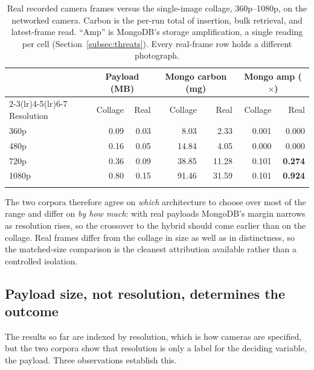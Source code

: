 \documentclass[pdflatex,sn-basic]{sn-jnl}%
\begin{document}
\begin{table}[htbp]
\caption{Real recorded camera frames versus the single-image collage, 360p--1080p, on the networked camera. Carbon is the per-run total of insertion, bulk retrieval, and latest-frame read. ``Amp'' is MongoDB's storage amplification, a single reading per cell (Section~\ref{subsec:threats}). Every real-frame row holds a different photograph.}\label{tab:realframes}
\small
\begin{tabular}{@{}lrrrrrr@{}}
\toprule
 & \multicolumn{2}{c}{Payload (MB)} & \multicolumn{2}{c}{Mongo carbon (mg)} & \multicolumn{2}{c}{Mongo amp ($\times$)} \\
\cmidrule(lr){2-3}\cmidrule(lr){4-5}\cmidrule(lr){6-7}
Resolution & Collage & Real & Collage & Real & Collage & Real \\
\midrule
360p  & 0.09 & 0.03 &  8.03 &  2.33 & 0.001 & 0.000 \\
480p  & 0.16 & 0.05 & 14.84 &  4.05 & 0.000 & 0.000 \\
720p  & 0.36 & 0.09 & 38.85 & 11.28 & 0.101 & \textbf{0.274} \\
1080p & 0.80 & 0.15 & 91.46 & 31.59 & 0.101 & \textbf{0.924} \\
\botrule
\end{tabular}
\end{table}

The two corpora therefore agree on \emph{which} architecture to choose over most of the range and differ on \emph{by how much}: with real payloads MongoDB's margin narrows as resolution rises, so the crossover to the hybrid should come earlier than on the collage. Real frames differ from the collage in size as well as in distinctness, so the matched-size comparison is the cleanest attribution available rather than a controlled isolation.

\subsection{Payload size, not resolution, determines the outcome}\label{subsec:sizevsres}
The results so far are indexed by resolution, which is how cameras are specified, but the two corpora show that resolution is only a label for the deciding variable, the payload. Three observations establish this.
\end{document}
